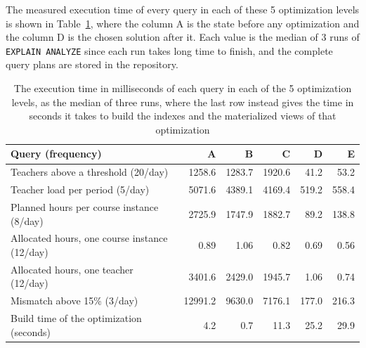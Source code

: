 \documentclass[a4paper]{scrartcl}
\renewcommand{\_}{\textunderscore\allowbreak}
\begin{document}
The measured execution time of every query in each of these 5 optimization levels is shown in Table~\ref{tab:performance}, where the column A is the state before any optimization and the column D is the chosen solution after it. Each value is the median of 3 runs of \texttt{EXPLAIN ANALYZE} since each run takes long time to finish, and the complete query plans are stored in the repository. 

\begin{table}[h!]
\centering
\footnotesize
\begin{tabular}{|l|r|r|r|r|r|}
\hline
\textbf{Query (frequency)} & \textbf{A} & \textbf{B} & \textbf{C} & \textbf{D} & \textbf{E} \\
\hline
Teachers above a threshold (20/day) & 1258.6 & 1283.7 & 1920.6 & 41.2 & 53.2 \\
Teacher load per period (5/day) & 5071.6 & 4389.1 & 4169.4 & 519.2 & 558.4 \\
Planned hours per course instance (8/day) & 2725.9 & 1747.9 & 1882.7 & 89.2 & 138.8 \\
Allocated hours, one course instance (12/day) & 0.89 & 1.06 & 0.82 & 0.69 & 0.56 \\
Allocated hours, one teacher (12/day) & 3401.6 & 2429.0 & 1945.7 & 1.06 & 0.74 \\
Mismatch above 15\% (3/day) & 12991.2 & 9630.0 & 7176.1 & 177.0 & 216.3 \\
\hline
Build time of the optimization (seconds) & 4.2 & 0.7 & 11.3 & 25.2 & 29.9 \\
\hline
\end{tabular}
\caption{The execution time in milliseconds of each query in each of the 5 optimization levels, as the median of three runs, where the last row instead gives the time in seconds it takes to build the indexes and the materialized views of that optimization}
\label{tab:performance}
\end{table}

\end{document}
